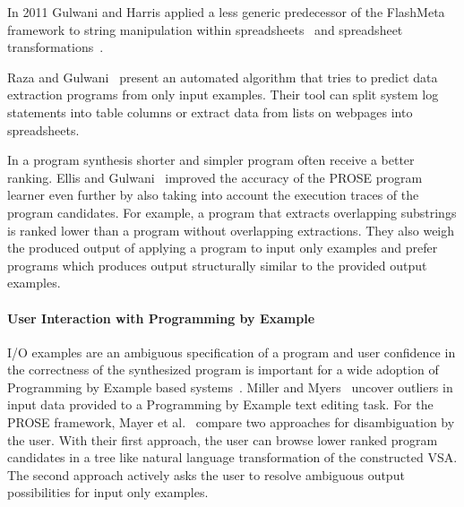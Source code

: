 \documentclass[\myrootdir/main.tex]{subfiles}
\begin{document}
In 2011 Gulwani and Harris applied a less generic predecessor of the FlashMeta framework to string manipulation within spreadsheets~\cite{gulwani2011automating} and spreadsheet transformations~\cite{harris2011spreadsheet}.

Raza and Gulwani~\cite{raza2017automated} present an automated algorithm that tries to predict data extraction programs from only input examples.
Their tool can split system log statements into table columns or extract data from lists on webpages into spreadsheets.

In a program synthesis shorter and simpler program often receive a better ranking.
Ellis and Gulwani~\cite{ellis2017learning} improved the accuracy of the PROSE program learner even further by also taking into account the execution traces of the program candidates.
For example, a program that extracts overlapping substrings is ranked lower than a program without overlapping extractions.
They also weigh the produced output of applying a program to input only examples and prefer programs which produces output structurally similar to the provided output examples.

\paragraph{User Interaction with Programming by Example}
I/O examples are an ambiguous specification of a program and user confidence in the correctness of the synthesized program is important for a wide adoption of Programming by Example based systems~\cite{lau2009why-programming-by-demonstration}.
Miller and Myers~\cite{miller2001outlier} uncover outliers in input data provided to a Programming by Example text editing task.
For the PROSE framework, Mayer et al.~\cite{mayer2015user} compare two approaches for disambiguation by the user.
With their first approach, the user can browse lower ranked program candidates in a tree like natural language transformation of the constructed VSA.
The second approach actively asks the user to resolve ambiguous output possibilities for input only examples.
\end{document}
